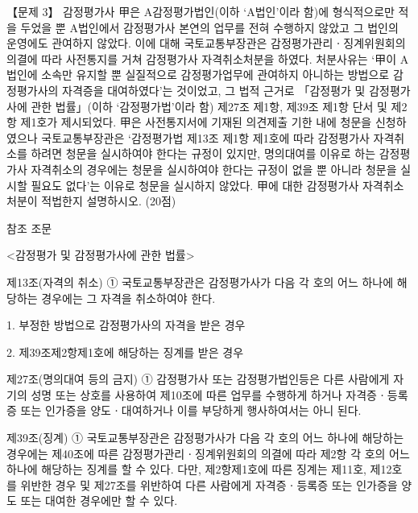 \begin{longquestion}{【문제 3】}
감정평가사 甲은 A감정평가법인(이하 ‘A법인’이라 함)에 형식적으로만 적을 두었을 뿐 A법인에서 감정평가사 본연의 업무를 전혀 수행하지 않았고 그 법인의 운영에도 관여하지 않았다. 이에 대해 국토교통부장관은 감정평가관리ㆍ징계위원회의 의결에 따라 사전통지를 거쳐 감정평가사 자격취소처분을 하였다. 처분사유는 ‘甲이 A법인에 소속만 유지할 뿐 실질적으로 감정평가업무에 관여하지 아니하는 방법으로 감정평가사의 자격증을 대여하였다’는 것이었고, 그 법적 근거로 「감정평가 및 감정평가사에 관한 법률」(이하 ‘감정평가법’이라 함) 제27조 제1항, 제39조 제1항 단서 및 제2항 제1호가 제시되었다. 甲은 사전통지서에 기재된 의견제출 기한 내에 청문을 신청하였으나 국토교통부장관은 ‘감정평가법 제13조 제1항 제1호에 따라 감정평가사 자격취소를 하려면 청문을 실시하여야 한다는 규정이 있지만, 명의대여를 이유로 하는 감정평가사 자격취소의 경우에는 청문을 실시하여야 한다는 규정이 없을 뿐 아니라 청문을 실시할 필요도 없다’는 이유로 청문을 실시하지 않았다. 甲에 대한 감정평가사 자격취소처분이 적법한지 설명하시오. (20점) \par
\begin{framedtext}
참조 조문 \par
<감정평가 및 감정평가사에 관한 법률> \par
제13조(자격의 취소) ① 국토교통부장관은 감정평가사가 다음 각 호의 어느 하나에 해당하는 경우에는 그 자격을 취소하여야 한다. \par
1. 부정한 방법으로 감정평가사의 자격을 받은 경우 \par
2. 제39조제2항제1호에 해당하는 징계를 받은 경우 \par
제27조(명의대여 등의 금지) ① 감정평가사 또는 감정평가법인등은 다른 사람에게 자기의 성명 또는 상호를 사용하여 제10조에 따른 업무를 수행하게 하거나 자격증ㆍ등록증 또는 인가증을 양도ㆍ대여하거나 이를 부당하게 행사하여서는 아니 된다. \par
제39조(징계) ① 국토교통부장관은 감정평가사가 다음 각 호의 어느 하나에 해당하는 경우에는 제40조에 따른 감정평가관리ㆍ징계위원회의 의결에 따라 제2항 각 호의 어느 하나에 해당하는 징계를 할 수 있다. 다만, 제2항제1호에 따른 징계는 제11호, 제12호를 위반한 경우 및 제27조를 위반하여 다른 사람에게 자격증ㆍ등록증 또는 인가증을 양도 또는 대여한 경우에만 할 수 있다. \par

\end{framedtext}
\end{longquestion}
